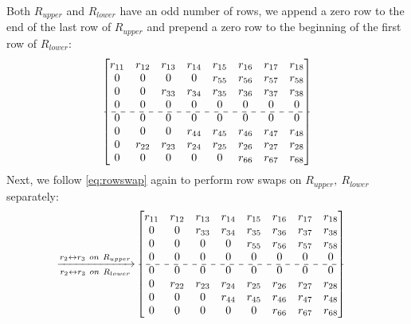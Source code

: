 \documentclass[12pt]{article}
\numberwithin{equation}{section}
\begin{document}
 Both \( R_{upper} \) and \( R_{lower} \) have an odd number of rows,
we append a zero row to the end of the last row of \( R_{upper} \) and prepend a zero row to the beginning of the first row of \( R_{lower} \):
\begin{align*}
\begin{bmatrix}
 r_{11} & r_{12} & r_{13} & r_{14} & r_{15} & r_{16} & r_{17} & r_{18}\\
 0      & 0      & 0      & 0      & r_{55} & r_{56} & r_{57} & r_{58}\\
 0      & 0      & r_{33} & r_{34} & r_{35} & r_{36} & r_{37} & r_{38}\\
 0      & 0      & 0      & 0      & 0      & 0      & 0      & 0     \\
 \cdashline{1-8}
 0      & 0      & 0      & 0      & 0      & 0      & 0      & 0     \\
 0      & 0      & 0      & r_{44} & r_{45} & r_{46} & r_{47} & r_{48}\\
 0      & r_{22} & r_{23} & r_{24} & r_{25} & r_{26} & r_{27} & r_{28}\\
 0      & 0      & 0      & 0      & 0      & r_{66} & r_{67} & r_{68}\\
\end{bmatrix} 
\end{align*}
Next, we follow  \eqref{eq:rowswap} again to perform row swaps
on $R_{upper}, \ R_{lower}$ separately:
\begin{align*}
\xrightarrow[r_{2} \leftrightarrow r_{3}\ on\ R_{lower}]{r_{2} \leftrightarrow r_{3}\ on\ R_{upper}}
&\begin{bmatrix}
 r_{11} & r_{12} & r_{13} & r_{14} & r_{15} & r_{16} & r_{17} & r_{18}\\
 0      & 0      & r_{33} & r_{34} & r_{35} & r_{36} & r_{37} & r_{38}\\
 0      & 0      & 0      & 0      & r_{55} & r_{56} & r_{57} & r_{58}\\
 0      & 0      & 0      & 0      & 0      & 0      &  0     & 0     \\
\cdashline{1-8}
 0      & 0      & 0      & 0      & 0      & 0      & 0      & 0     \\
 0      & r_{22} & r_{23} & r_{24} & r_{25} & r_{26} & r_{27} & r_{28}\\
 0      & 0      & 0      & r_{44} & r_{45} & r_{46} & r_{47} & r_{48}\\
 0      & 0      & 0      & 0      & 0      & r_{66} & r_{67} & r_{68}\\
\end{bmatrix}
\end{align*}\\
\end{document}
